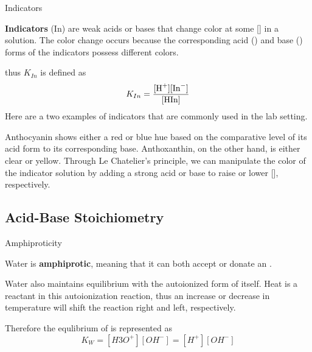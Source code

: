 \documentclass[10pt]{article}
\begin{document}
    \begin{core}[label=core:indicator]{Indicators}

      \textbf{Indicators} (In) are weak acids or bases that change color at some [] in a solution. The color change occurs because the corresponding acid () and base () forms of the indicators possess different colors.
    
    
      thus $K_{In}$ is defined as 
      \[
        K_{In} = \frac{[\ce{H+}][\ce{In-}]}{[\ce{HIn}]}
      \] 
      Here are a two examples of indicators that are commonly used in the lab setting.



      Anthocyanin shows either a red or blue hue based on the comparative level of its acid form to its corresponding base. Anthoxanthin, on the other hand, is either clear or yellow. Through Le Chatelier's principle, we can manipulate the color of the indicator solution by adding a strong acid or base to raise or lower [], respectively. 

    \end{core}
    
  \subsection{Acid-Base Stoichiometry}

    \begin{core}{Amphiproticity}
   
      Water is \textbf{amphiprotic}, meaning that it can both accept or donate an .



      Water also maintains equilibrium with the autoionized form of itself. Heat is a reactant in this autoionization reaction, thus an increase or decrease in temperature will shift the reaction right and left, respectively.


      Therefore the equlibrium of  is represented as
      \[
        K_{W} = [H3O^{+}][OH^{-}] = [H^{+}][OH^{-}]
      \]

    \end{core}
\end{document}
